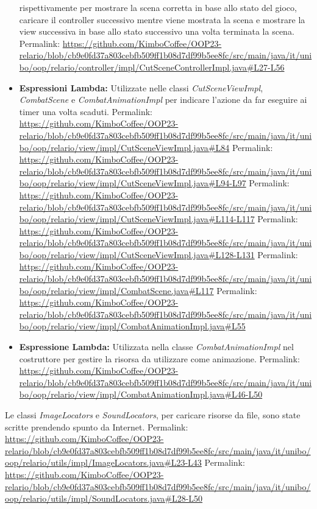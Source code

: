 \documentclass[a4paper,12pt]{report}
\begin{document}
\begin{itemize}
	rispettivamente per mostrare la scena corretta in base allo stato del gioco, caricare il controller successivo mentre viene mostrata la scena e mostrare la view successiva in
	base allo stato successivo una volta terminata la scena.
	Permalink: \url{https://github.com/KimboCoffee/OOP23-relario/blob/cb9e0fd37a803cebfb509ff1b08d7df99b5ee8fc/src/main/java/it/unibo/oop/relario/controller/impl/CutSceneControllerImpl.java#L27-L56}
	\item \textbf{Espressioni Lambda:} Utilizzate nelle classi \textit{CutSceneViewImpl}, \textit{CombatScene} e \textit{CombatAnimationImpl} per indicare l'azione da far eseguire ai timer una volta scaduti.
	Permalink: \url{https://github.com/KimboCoffee/OOP23-relario/blob/cb9e0fd37a803cebfb509ff1b08d7df99b5ee8fc/src/main/java/it/unibo/oop/relario/view/impl/CutSceneViewImpl.java#L84}
	Permalink: \url{https://github.com/KimboCoffee/OOP23-relario/blob/cb9e0fd37a803cebfb509ff1b08d7df99b5ee8fc/src/main/java/it/unibo/oop/relario/view/impl/CutSceneViewImpl.java#L94-L97}
	Permalink: \url{https://github.com/KimboCoffee/OOP23-relario/blob/cb9e0fd37a803cebfb509ff1b08d7df99b5ee8fc/src/main/java/it/unibo/oop/relario/view/impl/CutSceneViewImpl.java#L114-L117}
	Permalink: \url{https://github.com/KimboCoffee/OOP23-relario/blob/cb9e0fd37a803cebfb509ff1b08d7df99b5ee8fc/src/main/java/it/unibo/oop/relario/view/impl/CutSceneViewImpl.java#L128-L131}
	Permalink: \url{https://github.com/KimboCoffee/OOP23-relario/blob/cb9e0fd37a803cebfb509ff1b08d7df99b5ee8fc/src/main/java/it/unibo/oop/relario/view/impl/CombatScene.java#L117}
	Permalink: \url{https://github.com/KimboCoffee/OOP23-relario/blob/cb9e0fd37a803cebfb509ff1b08d7df99b5ee8fc/src/main/java/it/unibo/oop/relario/view/impl/CombatAnimationImpl.java#L55}
	\item \textbf{Espressione Lambda:} Utilizzata nella classe \textit{CombatAnimationImpl} nel costruttore per gestire la risorsa da utilizzare come animazione.
	Permalink: \url{https://github.com/KimboCoffee/OOP23-relario/blob/cb9e0fd37a803cebfb509ff1b08d7df99b5ee8fc/src/main/java/it/unibo/oop/relario/view/impl/CombatAnimationImpl.java#L46-L50}
\end{itemize}

Le classi \textit{ImageLocators} e \textit{SoundLocators}, per caricare risorse da file, sono state scritte prendendo spunto da Internet.
Permalink: \url{https://github.com/KimboCoffee/OOP23-relario/blob/cb9e0fd37a803cebfb509ff1b08d7df99b5ee8fc/src/main/java/it/unibo/oop/relario/utils/impl/ImageLocators.java#L23-L43}
Permalink: \url{https://github.com/KimboCoffee/OOP23-relario/blob/cb9e0fd37a803cebfb509ff1b08d7df99b5ee8fc/src/main/java/it/unibo/oop/relario/utils/impl/SoundLocators.java#L28-L50}
\end{document}

